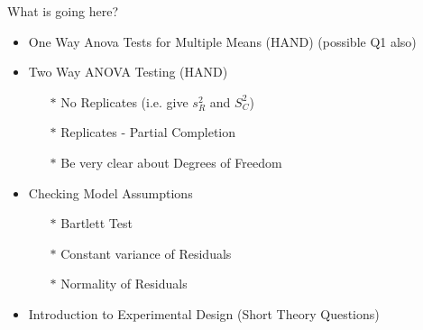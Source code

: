 \documentclass[a4paper,12pt]{article}
\begin{document}
\begin{framed}
	What is going here?
	\begin{itemize}
		\item One Way Anova Tests for Multiple Means (HAND) (possible Q1 also)
		\item Two Way ANOVA Testing (HAND)
		\begin{itemize}
			\item[$\ast$] No Replicates (i.e. give $s^2_R$ and $S^2_C$)
			\item[$\ast$] Replicates - Partial Completion
			\item[$\ast$] Be very clear about Degrees of Freedom
		\end{itemize}
		\item Checking Model Assumptions 
				\begin{itemize}
					\item[$\ast$] Bartlett Test
					\item[$\ast$] Constant variance of Residuals
					\item[$\ast$] Normality of Residuals
				\end{itemize}
		\item Introduction to Experimental Design (Short Theory Questions)
	\end{itemize}
\end{framed}

\newpage
\end{document}
